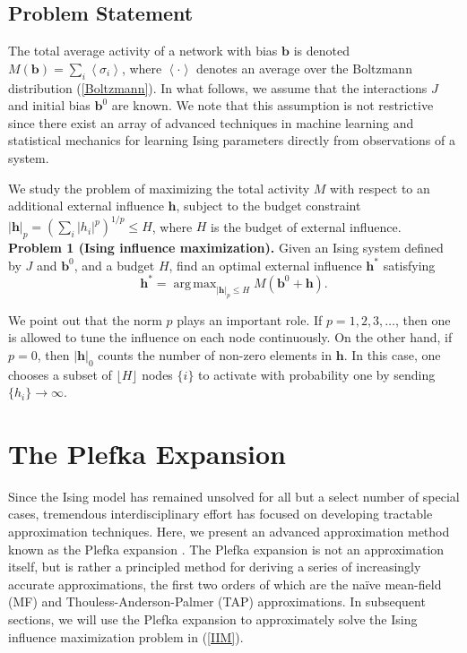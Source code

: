 \documentclass[letterpaper]{article} %
\DeclareMathOperator*{\argmax}{arg\,max}
\begin{document}
\subsection{Problem Statement}

The total average activity of a network with bias $\bm{b}$ is denoted $M(\bm{b}) = \sum_i\left<\sigma_i\right>$, where $\left<\cdot\right>$ denotes an average over the Boltzmann distribution (\ref{Boltzmann}). In what follows, we assume that the interactions $J$ and initial bias $\bm{b}^0$ are known. We note that this assumption is not restrictive since there exist an array of advanced techniques in machine learning \cite{Ackley-01} and statistical mechanics \cite{Aurell-01} for learning Ising parameters directly from observations of a system. 

We study the problem of maximizing the total activity $M$ with respect to an additional external influence $\bm{h}$, subject to the budget constraint $|\bm{h}|_p = \left(\sum_i | h_i |^p\right)^{1/p} \le H$, where $H$ is the budget of external influence. \\

\noindent \textbf{Problem 1 (Ising influence maximization).} Given an Ising system defined by $J$ and $\bm{b}^0$, and a budget $H$, find an optimal external influence $\bm{h}^*$ satisfying
\begin{equation}
\label{IIM}
\bm{h}^* = \argmax_{|\bm{h}|_p \le H} M(\bm{b}^0 + \bm{h}).
\end{equation}

\noindent We point out that the norm $p$ plays an important role. If $p = 1,2,3,\hdots$, then one is allowed to tune the influence on each node continuously. On the other hand, if $p = 0$, then $|\bm{h}|_0$ counts the number of non-zero elements in $\bm{h}$. In this case, one chooses a subset of $\lfloor H\rfloor$ nodes $\{i\}$ to activate with probability one by sending $\{h_i\} \rightarrow \infty$.

\section{The Plefka Expansion}

\noindent Since the Ising model has remained unsolved for all but a select number of special cases, tremendous interdisciplinary effort has focused on developing tractable approximation techniques. Here, we present an advanced approximation method known as the Plefka expansion \cite{Yedidia-01}. The Plefka expansion is not an approximation itself, but is rather a principled method for deriving a series of increasingly accurate approximations, the first two orders of which are the na\"{i}ve mean-field (MF) and Thouless-Anderson-Palmer (TAP) approximations. In subsequent sections, we will use the Plefka expansion to approximately solve the Ising influence maximization problem in (\ref{IIM}).
\end{document}
